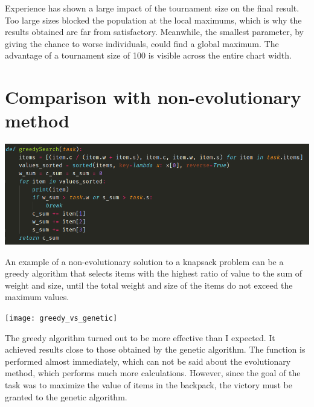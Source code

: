 \documentclass[12pt]{article}
\begin{document}
Experience has shown a large impact of the tournament size on the final result. Too large sizes blocked the population at the local maximums, which is why the results obtained are far from satisfactory. Meanwhile, the smallest parameter, by giving the chance to worse individuals, could find a global maximum. The advantage of a tournament size of 100 is visible across the entire chart width.

\section{Comparison with non-evolutionary method}
\begin{center}
	\includegraphics[scale=0.5]{greedy}
\end{center}

An example of a non-evolutionary solution to a knapsack problem can be a greedy algorithm that selects items with the highest ratio of value to the sum of weight and size, until the total weight and size of the items do not exceed the maximum values.

\texttt{[image: greedy\_vs\_genetic]}

The greedy algorithm turned out to be more effective than I expected. It achieved results close to those obtained by the genetic algorithm. The function is performed almost immediately, which can not be said about the evolutionary method, which performs much more calculations. However, since the goal of the task was to maximize the value of items in the backpack, the victory must be granted to the genetic algorithm.
\end{document}
